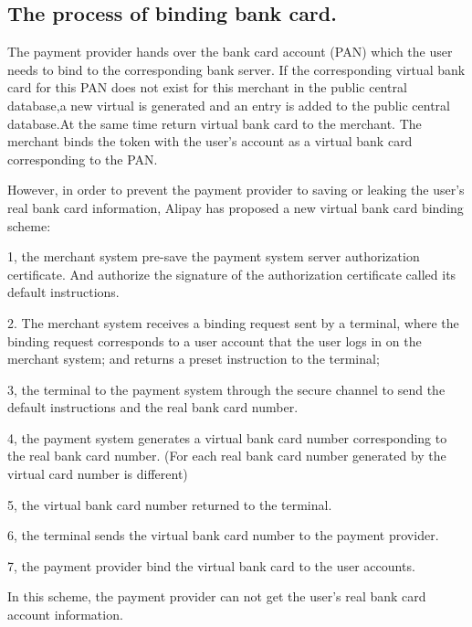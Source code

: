 \documentclass[journal]{IEEEtran}
\begin{document}
\subsection{The process of binding bank card.}
The payment provider hands over the bank card account (PAN) which the user needs to bind to the corresponding bank server. If the corresponding virtual bank card for this PAN does not exist for this merchant in the public central database,a new virtual is generated and an entry is added to the public central database.At the same time return virtual bank card to the merchant. The merchant binds the token with the user's account as a virtual bank card corresponding to the PAN.

However, in order to prevent the payment provider to saving or leaking the user's real bank card information, Alipay has proposed a new virtual bank card binding scheme:

1, the merchant system pre-save the payment system server authorization certificate. And authorize the signature of the authorization certificate called its default instructions.

2. The merchant system receives a binding request sent by a terminal, where the binding request corresponds to a user account that the user logs in on the merchant system; and returns a preset instruction to the terminal;

3, the terminal to the payment system through the secure channel to send the default instructions and the real bank card number.

4, the payment system generates a virtual bank card number corresponding to the real bank card number. (For each real bank card number generated by the virtual card number is different)

5, the virtual bank card number returned to the terminal.

6, the terminal sends the virtual bank card number to the payment provider.

7, the payment provider bind the virtual bank card to the user accounts.

In this scheme, the payment provider can not get the user's real bank card account information.
\end{document}
